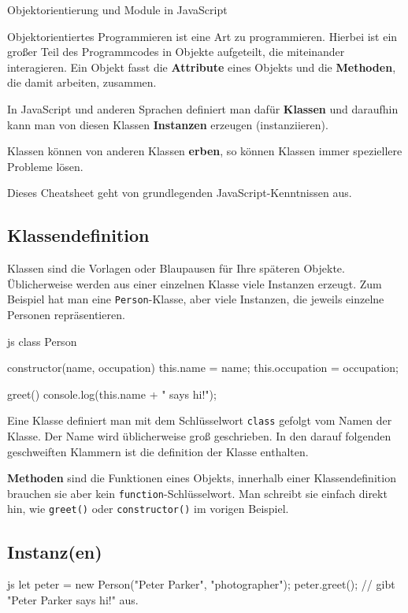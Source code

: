 \documentclass[10pt,a4paper]{article}
\begin{document}
{\color{accentcolor}Objektorientierung und Module in JavaScript}

\begin{multicols}{3}

\scriptsize

Objektorientiertes Programmieren ist eine Art zu programmieren. Hierbei ist ein großer Teil des Programmcodes in Objekte aufgeteilt, die miteinander interagieren. Ein Objekt fasst die \textbf{Attribute} eines Objekts und die \textbf{Methoden}, die damit arbeiten, zusammen.\par

In JavaScript und anderen Sprachen definiert man dafür \textbf{Klassen} und daraufhin kann man von diesen Klassen \textbf{Instanzen} erzeugen (instanziieren).

Klassen können von anderen Klassen \textbf{erben}, so können Klassen immer speziellere Probleme lösen.

Dieses Cheatsheet geht von grundlegenden JavaScript-Kenntnissen aus.

\subsection*{Klassendefinition}

Klassen sind die Vorlagen oder Blaupausen für Ihre späteren Objekte. Üblicherweise werden aus einer einzelnen Klasse viele Instanzen erzeugt. Zum Beispiel hat man eine \texttt{Person}-Klasse, aber viele Instanzen, die jeweils einzelne Personen repräsentieren.

\begin{codebox}{js}{}
class Person {
  constructor(name, occupation) {
    this.name = name;
    this.occupation = occupation;
  }

  greet() {
    console.log(this.name  + " says hi!");
  }
}
\end{codebox}

Eine Klasse definiert man mit dem Schlüsselwort \texttt{class} gefolgt vom Namen der Klasse. Der Name wird üblicherweise groß geschrieben. In den darauf folgenden geschweiften Klammern ist die definition der Klasse enthalten.

\textbf{Methoden} sind die Funktionen eines Objekts, innerhalb einer Klassendefinition brauchen sie aber kein \texttt{function}-Schlüsselwort. Man schreibt sie einfach direkt hin, wie \texttt{greet()} oder \texttt{constructor()} im vorigen Beispiel.

\subsection*{Instanz(en)}
\begin{codebox}{js}{}
let peter = new Person("Peter Parker", "photographer");
peter.greet();
// gibt "Peter Parker says hi!" aus.


\end{codebox}
\end{multicols}
\end{document}
